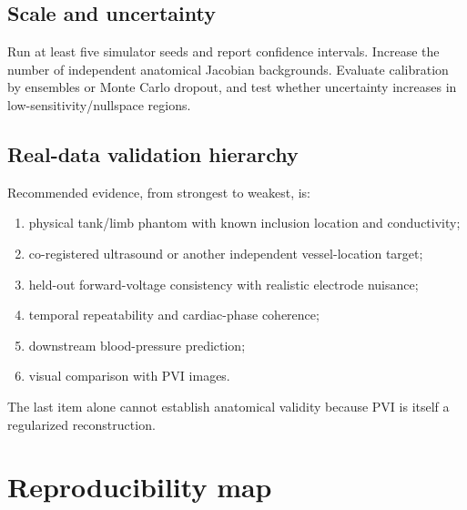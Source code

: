 \documentclass[11pt]{article}
\begin{document}
\subsection{Scale and uncertainty}

Run at least five simulator seeds and report confidence intervals.  Increase the
number of independent anatomical Jacobian backgrounds.  Evaluate calibration by
ensembles or Monte Carlo dropout, and test whether uncertainty increases in
low-sensitivity/nullspace regions.

\subsection{Real-data validation hierarchy}

Recommended evidence, from strongest to weakest, is:
\begin{enumerate}
\item physical tank/limb phantom with known inclusion location and conductivity;
\item co-registered ultrasound or another independent vessel-location target;
\item held-out forward-voltage consistency with realistic electrode nuisance;
\item temporal repeatability and cardiac-phase coherence;
\item downstream blood-pressure prediction;
\item visual comparison with PVI images.
\end{enumerate}
The last item alone cannot establish anatomical validity because PVI is itself a
regularized reconstruction.

\section{Reproducibility map}
\end{document}
